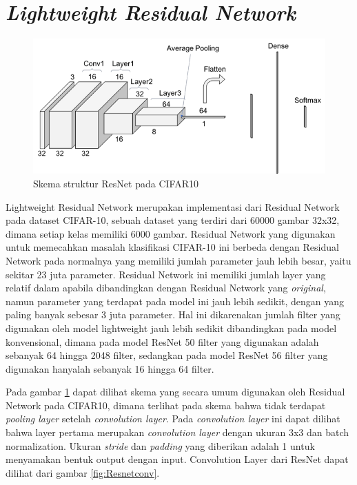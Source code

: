 \section{\textit{Lightweight Residual Network}}
\vspace{1ex}

\begin{figure}[h!]
	\centering
	\includegraphics[scale=0.3]{img/StructureLightweightResNet.png}
	\caption{Skema struktur ResNet pada CIFAR10}
	\label{fig:ResnetScheme}
\end{figure}

Lightweight Residual Network merupakan implementasi dari Residual Network pada dataset CIFAR-10, sebuah dataset yang terdiri dari 60000 gambar 32x32, dimana setiap kelas memiliki 6000 gambar. Residual Network yang digunakan untuk memecahkan masalah klasifikasi CIFAR-10 ini berbeda dengan Residual Network pada normalnya yang memiliki jumlah parameter jauh lebih besar, yaitu sekitar 23 juta parameter. Residual Network ini memiliki jumlah layer yang relatif dalam apabila dibandingkan dengan Residual Network yang \textit{original}, namun parameter yang terdapat pada model ini jauh lebih sedikit, dengan yang paling banyak sebesar 3 juta parameter. Hal ini dikarenakan jumlah filter yang digunakan oleh model lightweight jauh lebih sedikit dibandingkan pada model konvensional, dimana pada model ResNet 50 filter yang digunakan adalah sebanyak 64 hingga 2048 filter, sedangkan pada model ResNet 56 filter yang digunakan hanyalah sebanyak 16 hingga 64 filter.

Pada gambar \ref{fig:ResnetScheme} dapat dilihat skema yang secara umum digunakan oleh Residual Network pada CIFAR10, dimana terlihat pada skema bahwa tidak terdapat \textit{pooling layer} setelah \textit{convolution layer}. Pada \textit{convolution layer} ini dapat dilihat bahwa layer pertama merupakan \textit{convolution layer} dengan ukuran 3x3 dan batch normalization. Ukuran \textit{stride} dan \textit{padding} yang diberikan adalah 1 untuk menyamakan bentuk output dengan input. Convolution Layer dari ResNet dapat dilihat dari gambar \ref{fig:Resnetconv}.

